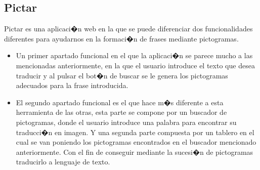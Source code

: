 \subsection{Pictar}
Pictar \citep{MartinGuerrero2018} es una aplicaci�n web en la que se puede diferenciar dos funcionalidades diferentes para ayudarnos en la formaci�n de frases mediante pictogramas.
\begin{itemize}
  \item Un primer apartado funcional en el que la aplicaci�n se parece mucho a las mencionadas anteriormente, en la que el usuario introduce el texto que desea traducir y al pulsar el bot�n de buscar 
se le genera los pictogramas adecuados para la frase introducida.
  \item El segundo apartado funcional es el que hace m�s diferente a esta herramienta de las otras, esta parte se compone por un buscador de pictogramas, donde el usuario introduce una palabra para encontrar su traducci�n en imagen. Y una segunda parte compuesta por un tablero en el cual se van poniendo los pictogramas encontrados en el buscador mencionado anteriormente. Con el fin de conseguir mediante la sucesi�n de pictogramas traducirlo a lenguaje de texto.   
\end{itemize}
